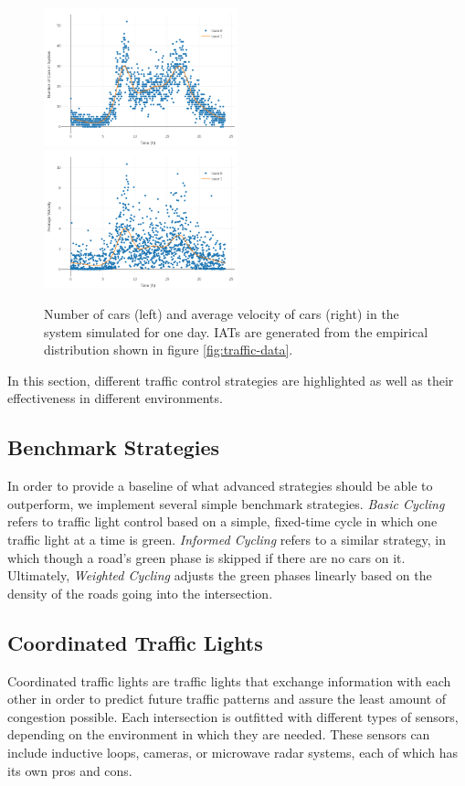 \documentclass[10pt]{article}
\begin{document}
\begin{figure}[htb]
	\includegraphics[width=0.5\textwidth]{img/number_of_cars_over_day.png}
	\includegraphics[width=0.5\textwidth]{img/velocity_over_day.png}
	\caption{Number of cars (left) and average velocity of cars (right) in the system simulated for one day. IATs are generated from the empirical distribution shown in figure \ref{fig:traffic-data}. \label{fig:validation}}
\end{figure}

\label{sec:strategies}
In this section, different traffic control strategies are highlighted as well as their effectiveness in different environments.

\subsection{Benchmark Strategies}
In order to provide a baseline of what advanced strategies should be able to outperform, we implement several simple benchmark strategies. \textit{Basic Cycling} refers to traffic light control based on a simple, fixed-time cycle in which one traffic light at a time is green. \textit{Informed Cycling} refers to a similar strategy, in which though a road's green phase is skipped if there are no cars on it. Ultimately, \textit{Weighted Cycling} adjusts the green phases linearly based on the density of the roads going into the intersection.

\subsection{Coordinated Traffic Lights}
Coordinated traffic lights are traffic lights that exchange information with each other in order to predict future traffic patterns and assure the least amount of congestion possible.  Each intersection is outfitted with different types of sensors, depending on the environment in which they are needed.  These sensors can include inductive loops, cameras, or microwave radar systems, each of which has its own pros and cons.
\end{document}
